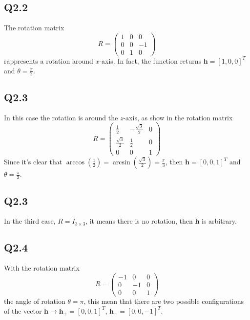 \subsection{Q2.2} 
The rotation matrix
\begin{equation*}
	R = \begin{pmatrix}
        1& 0 & 0 \\
        0 & 0 & -1 \\
        0 & 1 & 0
    \end{pmatrix}
\end{equation*}
rappresents a rotation around $x$-axis. In fact, the function returns $\mathbf{h} = [1,0,0]^T$ and $\theta = \frac{\pi}{2}$.
\subsection{Q2.3} \label{subsec::q23}
In this case the rotation is around the $z$-axis, as show in the rotation matrix
\begin{equation*}
	R = \begin{pmatrix}
		\frac{1}{2}& -\frac{\sqrt{3}}{2} & 0 \\
		\frac{\sqrt{3}}{2} & \frac{1}{2} & 0 \\
		0 & 0 & 1
	\end{pmatrix}
\end{equation*}
Since it’s clear that $\arccos(\frac{1}{2})=\arcsin(\frac{\sqrt{3}}{2})= \frac{\pi}{3}$, then $\mathbf{h} = [0,0,1]^T$ and $\theta = \frac{\pi}{3}$. 
\subsection{Q2.3}
In the third case, $R = I_{3\times 3}$, it means there is no rotation, then $\mathbf{h}$ is arbitrary.
\subsection{Q2.4}
With the rotation matrix 
\begin{equation*}
	R = \begin{pmatrix}
		-1& 0 & 0 \\
		0 & -1 & 0 \\
		0 & 0 & 1
	\end{pmatrix}
\end{equation*}
the angle of rotation $\theta = \pi$, this mean that there are two possible configurations of the vector $\mathbf{h} \rightarrow \mathbf{h}_+= [0,0,1]^T$, $\mathbf{h}_-= [0,0,-1]^T$.